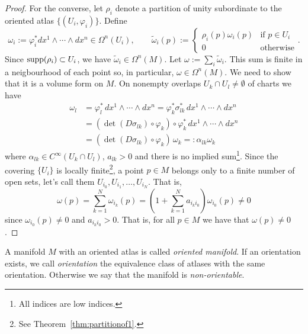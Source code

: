 \begin{proof}
  For the converse, let $\rho_i$ denote a partition of unity subordinate to the oriented atlas $\{(U_i, \varphi_i)\}$.
  Define
  \begin{equation}
    \omega_i := \varphi_i^* dx^1\wedge\cdots\wedge dx^n \in \Omega^n(U_i)
    , \qquad
    \widetilde \omega_i(p) := \begin{cases}
      \rho_i(p)\omega_i(p) & \mbox{if } p\in U_i \\
      0 & \mbox{otherwise}
    \end{cases}.
  \end{equation}
  Since $\operatorname{supp}(\rho_i) \subset U_i$, we have $\widetilde\omega_i\in\Omega^n(M)$.
  Let $\omega := \sum_i \widetilde \omega_i$. This sum is finite in a neigbourhood of each point so, in particular, $\omega \in \Omega^n(M)$. We need to show that it is a volume form on $M$.
  On nonempty overlaps $U_k \cap U_l \neq \emptyset$ of charts we have
  \begin{align}
    \omega_l &= \varphi_l^*\, dx^1\wedge\cdots\wedge dx^n = \varphi_k^* \sigma_{lk}^*\, dx^1 \wedge\cdots\wedge dx^n \\
             &= (\det(D\sigma_{lk})\circ \varphi_k)\circ \varphi^*_k\, dx^1\wedge\cdots\wedge dx^n \\
             &= (\det(D\sigma_{lk})\circ \varphi_k)\, \omega_k =: \alpha_{lk} \omega_k \label{form:cov}
  \end{align}
  where $\alpha_{lk}\in C^{\infty}(U_k\cap U_l)$, $a_{lk} > 0$ and there is no implied sum\footnote{All indices are low indices.}.
  Since the covering $\{U_i\}$ is locally finite\footnote{See Theorem~\ref{thm:partitionof1}.}, a point $p\in M$ belongs only to a finite number of open sets, let's call them $U_{i_0}, U_{i_1}, \ldots, U_{i_N}$. That is,
  \begin{equation}
  \omega(p) = \sum_{k=1}^N \omega_{i_k}(p) = \left( 1 + \sum_{k = 1}^N a_{i_k i_0} \right) \omega_{i_0}(p) \neq 0
  \end{equation}
  since $\omega_{i_0}(p) \neq 0$ and $a_{i_k i_0} > 0$.
  That is, for all $p\in M$ we have that $\omega(p) \neq 0$.
  \end{proof}


\begin{definition}
  A manifold $M$ with an oriented atlas is called \emph{oriented manifold}.
  If an orientation exists, we call \emph{orientation} the equivalence class of atlases with the same orientation.
  Otherwise we say that the manifold is \emph{non-orientable}.
\end{definition}

